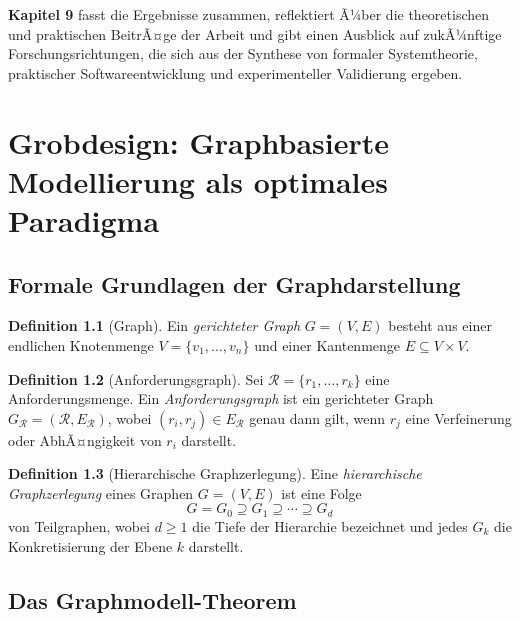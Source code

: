 ﻿\documentclass[a4paper,12pt]{report}
\theoremstyle{definition}
\newtheorem{definition}{Definition}[section]
\begin{document}
\textbf{Kapitel 9} fasst die Ergebnisse zusammen, reflektiert Ã¼ber die theoretischen und praktischen BeitrÃ¤ge der Arbeit und gibt einen Ausblick auf zukÃ¼nftige Forschungsrichtungen, die sich aus der Synthese von formaler Systemtheorie, praktischer Softwareentwicklung und experimenteller Validierung ergeben.

\chapter{Grobdesign: Graphbasierte Modellierung als optimales Paradigma}
\label{ch:grobdesign}
\label{sec:graphmodell}

\section{Formale Grundlagen der Graphdarstellung}

\begin{definition}[Graph]
Ein \emph{gerichteter Graph} $G = (V, E)$ besteht aus einer endlichen Knotenmenge
$V = \{v_1, \ldots, v_n\}$ und einer Kantenmenge
$E \subseteq V \times V$.
\end{definition}

\begin{definition}[Anforderungsgraph]
\label{def:anfgraph}
Sei $\mathcal{R} = \{r_1, \ldots, r_k\}$ eine Anforderungsmenge. Ein
\emph{Anforderungsgraph} ist ein gerichteter Graph
$G_{\mathcal{R}} = (\mathcal{R}, E_{\mathcal{R}})$, wobei
$(r_i, r_j) \in E_{\mathcal{R}}$ genau dann gilt, wenn $r_j$ eine Verfeinerung oder
AbhÃ¤ngigkeit von $r_i$ darstellt.
\end{definition}

\begin{definition}[Hierarchische Graphzerlegung]
\label{def:hierarchie}
Eine \emph{hierarchische Graphzerlegung} eines Graphen $G = (V, E)$ ist eine Folge
\[
  G = G_0 \supseteq G_1 \supseteq \cdots \supseteq G_d
\]
von Teilgraphen, wobei $d \geq 1$ die Tiefe der Hierarchie bezeichnet und jedes
$G_k$ die Konkretisierung der Ebene $k$ darstellt.
\end{definition}

\section{Das Graphmodell-Theorem}
\end{document}
